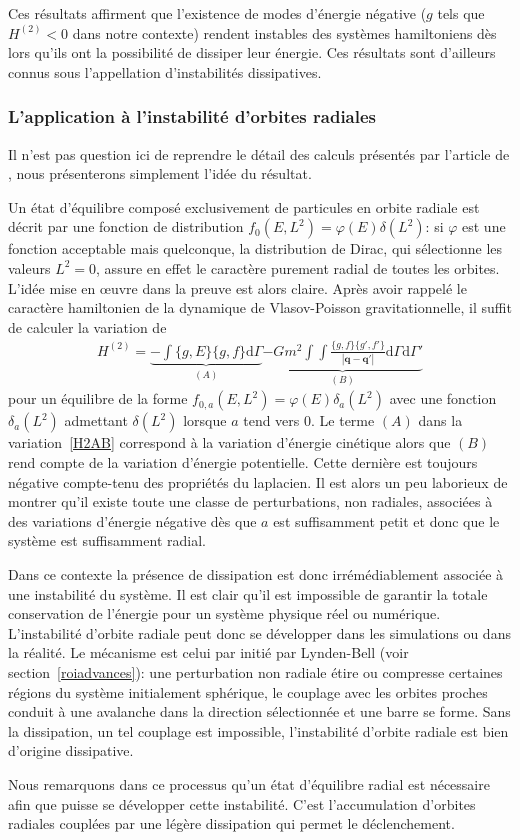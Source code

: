 Ces résultats affirment que l'existence de modes d'énergie négative ($g$ tels que $H^{(2)}<0$ dans notre contexte) rendent instables des systèmes
hamiltoniens dès lors qu'ils ont la possibilité de dissiper leur énergie. Ces résultats sont d'ailleurs connus sous l'appellation \og d'instabilités
dissipatives\fg.



\subsubsection{L'application à l'instabilité d'orbites radiales}

Il n'est pas question ici de reprendre le détail des calculs présentés par l'article de \cite{future}, nous présenterons
simplement l'idée du résultat.

Un état d'équilibre composé exclusivement de particules en orbite radiale est décrit par une fonction de distribution $f_0(E,L^2) = \varphi(E)
\delta(L^2)$: si $\varphi$ est une fonction acceptable mais quelconque, la distribution de Dirac, qui sélectionne les valeurs $L^2=0$,  assure en
effet le caractère purement radial de toutes les orbites. L'idée mise en œuvre dans la preuve est alors claire. Après avoir rappelé le caractère
hamiltonien de la dynamique de Vlasov-Poisson gravitationnelle, il suffit de calculer la variation de
\begin{align}
	H^{(2)} =
	\underbrace{- \int \{g,E\} \{g,f\} \mathrm{d} \Gamma}_{(A)}
	\underbrace{- G m^2 %
		\int\!\!\!\int \frac{\{g,f\}\{g',f'\}}{|\mathbf{q} - \mathbf{q'}|}
		\mathrm{d} \Gamma \mathrm{d} \Gamma'}_{(B)}
		\label{H2AB}
\end{align}
pour un équilibre de la forme $f_{0,a}(E,L^2) = \varphi(E) \delta_a (L^2)$ avec une fonction $\delta_a (L^2)$ admettant $\delta(L^2)$ lorsque $a$ tend
vers $0$. Le terme $(A)$ dans la variation~\ref{H2AB} correspond à la variation d'énergie cinétique alors que $(B)$ rend compte de la variation
d'énergie potentielle. Cette dernière est toujours négative compte-tenu des propriétés du laplacien. Il est alors un peu laborieux de montrer qu'il
existe toute une classe de perturbations, non radiales, associées à des variations d'énergie négative dès que $a$ est suffisamment petit et donc que
le système est suffisamment radial.

Dans ce contexte la présence de dissipation est donc irrémédiablement associée à une instabilité du système. Il est clair qu'il est impossible de
garantir la totale conservation de l'énergie pour un système physique réel ou numérique. L'instabilité d'orbite radiale peut donc se développer dans
les simulations ou dans la réalité. Le mécanisme est celui par initié par Lynden-Bell (voir section~\ref{roiadvances}): une perturbation non
radiale étire ou compresse certaines régions du système initialement sphérique, le couplage avec les orbites proches conduit à une avalanche dans la
direction sélectionnée et une barre se forme. Sans la dissipation, un tel couplage est impossible, l'instabilité d'orbite radiale est bien d'origine
dissipative.

Nous remarquons dans ce processus qu'un état d'équilibre radial est nécessaire afin que puisse se développer cette instabilité. C'est l'accumulation
d'orbites radiales couplées par une légère dissipation qui permet le déclenchement.




